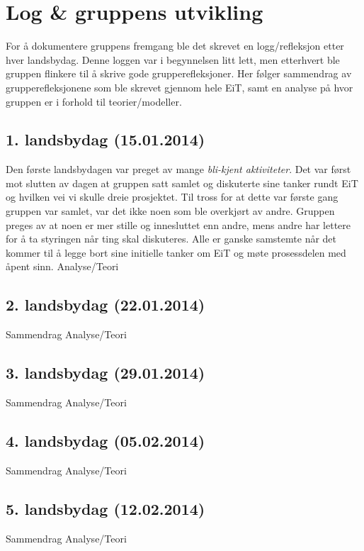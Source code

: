 \chapter{Log \& gruppens utvikling}
For å dokumentere gruppens fremgang ble det skrevet en logg/refleksjon etter hver landsbydag. 
Denne loggen var i begynnelsen litt lett, men etterhvert ble gruppen flinkere til å skrive gode grupperefleksjoner. 
Her følger sammendrag av grupperefleksjonene som ble skrevet gjennom hele EiT, samt en analyse på hvor gruppen er i forhold til teorier/modeller. 

\section{1. landsbydag (15.01.2014)}
Den første landsbydagen var preget av mange \textit{bli-kjent aktiviteter}. 
Det var først mot slutten av dagen at gruppen satt samlet og diskuterte sine tanker rundt EiT og hvilken vei vi skulle dreie prosjektet.
Til tross for at dette var første gang gruppen var samlet, var det ikke noen som ble overkjørt av andre. 
Gruppen preges av at noen er mer stille og innesluttet enn andre, mens andre har lettere for å ta styringen når ting skal diskuteres. 
Alle er ganske samstemte når det kommer til å legge bort sine initielle tanker om EiT og møte prosessdelen med åpent sinn. 
\vspace{\secspace}
Analyse/Teori

\section{2. landsbydag (22.01.2014)}
Sammendrag
\vspace{\secspace}
Analyse/Teori

\section{3. landsbydag (29.01.2014)}
Sammendrag
\vspace{\secspace}
Analyse/Teori

\section{4. landsbydag (05.02.2014)}
Sammendrag
\vspace{\secspace}
Analyse/Teori

\section{5. landsbydag (12.02.2014)}
Sammendrag
\vspace{\secspace}
Analyse/Teori

